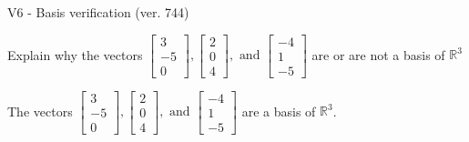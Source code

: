 \begin{exercise}
  \begin{exerciseTitle}V6 - Basis verification (ver. 744)\end{exerciseTitle}
  \begin{exerciseStatement}
    Explain why the vectors \(\left[\begin{array}{r}
3 \\
-5 \\
0
\end{array}\right] , \left[\begin{array}{r}
2 \\
0 \\
4
\end{array}\right] , \text{ and } \left[\begin{array}{r}
-4 \\
1 \\
-5
\end{array}\right]\) are or are not a basis of \(\mathbb{R}^3\)	


  \end{exerciseStatement}
  \begin{exerciseAnswer}
   The vectors \(\left[\begin{array}{r}
3 \\
-5 \\
0
\end{array}\right] , \left[\begin{array}{r}
2 \\
0 \\
4
\end{array}\right] , \text{ and } \left[\begin{array}{r}
-4 \\
1 \\
-5
\end{array}\right]\) 
  	 are  a basis of \(\mathbb{R}^3\).
  


  \end{exerciseAnswer}
\end{exercise}